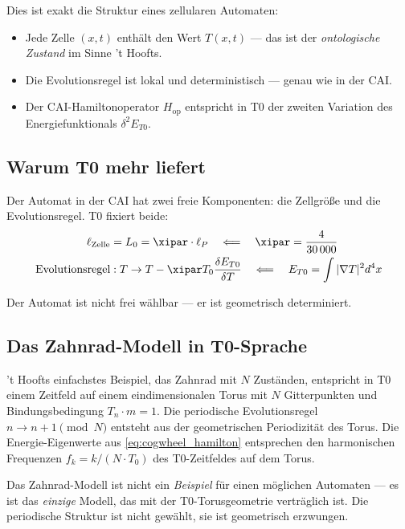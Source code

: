 Dies ist exakt die Struktur eines zellularen Automaten:
\begin{itemize}
    \item Jede Zelle $(x, t)$ enthält den Wert $T(x,t)$ — das ist der
    \emph{ontologische Zustand} im Sinne 't Hoofts.
    \item Die Evolutionsregel ist lokal und deterministisch — genau wie in der CAI.
    \item Der CAI-Hamiltonoperator $H_{\text{op}}$ entspricht in T0 der
    zweiten Variation des Energiefunktionals $\delta^2 E_{T0}$.
\end{itemize}

\subsection{Warum T0 mehr liefert}

Der Automat in der CAI hat zwei freie Komponenten: die Zellgröße und die
Evolutionsregel. T0 fixiert beide:
\begin{align}
    \ell_{\text{Zelle}} &= L_0 = \xipar \cdot \ell_P
    \quad \Longleftarrow \quad \xipar = \frac{4}{30\,000}
    \label{eq:cell_size_fixed} \\
    \text{Evolutionsregel} &: T \to T - \xipar T_0 \frac{\delta E_{T0}}{\delta T}
    \quad \Longleftarrow \quad E_{T0} = \int |\nabla T|^2 d^4x
    \label{eq:rule_fixed}
\end{align}

Der Automat ist nicht frei wählbar — er ist geometrisch determiniert.

\subsection{Das Zahnrad-Modell in T0-Sprache}

't Hoofts einfachstes Beispiel, das Zahnrad mit $N$ Zuständen, entspricht in T0
einem Zeitfeld auf einem eindimensionalen Torus mit $N$ Gitterpunkten und
Bindungsbedingung $T_n \cdot m = 1$. Die periodische Evolutionsregel
$n \to n + 1 \pmod{N}$ entsteht aus der geometrischen Periodizität des Torus.
Die Energie-Eigenwerte aus \eqref{eq:cogwheel_hamilton} entsprechen den
harmonischen Frequenzen $f_k = k/(N \cdot T_0)$ des T0-Zeitfeldes auf dem Torus.

\begin{insightBox}
    Das Zahnrad-Modell ist nicht ein \emph{Beispiel} für einen möglichen Automaten —
    es ist das \emph{einzige} Modell, das mit der T0-Torusgeometrie verträglich ist.
    Die periodische Struktur ist nicht gewählt, sie ist geometrisch erzwungen.
\end{insightBox}

